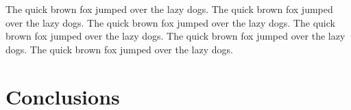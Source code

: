 \documentclass[12pt]{article}
\begin{document}
The quick brown fox jumped over the lazy dogs. 
The quick brown fox jumped over the lazy dogs. 
The quick brown fox jumped over the lazy dogs. 
The quick brown fox jumped over the lazy dogs. 
The quick brown fox jumped over the lazy dogs. 
The quick brown fox jumped over the lazy dogs. 

\newpage

\section{Conclusions}

\end{document}
